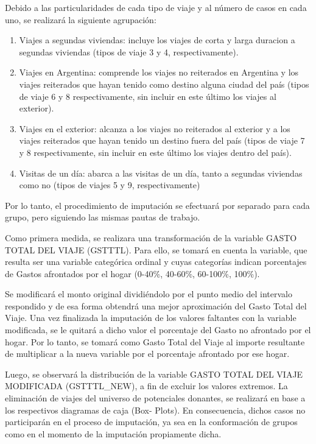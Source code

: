 \documentclass[
  openany]{book}
\begin{document}
Debido a las particularidades de cada tipo de viaje y al número de casos en cada uno, se realizará la siguiente agrupación:

\begin{enumerate}
\def\labelenumi{\arabic{enumi}.}
\item
  Viajes a segundas viviendas: incluye los viajes de corta y larga duracion a segundas viviendas (tipos de viaje 3 y 4, respectivamente).
\item
  Viajes en Argentina: comprende los viajes no reiterados en Argentina y los viajes reiterados que hayan tenido como destino alguna ciudad del país (tipos de viaje 6 y 8 respectivamente, sin incluir en este último los viajes al exterior).
\item
  Viajes en el exterior: alcanza a los viajes no reiterados al exterior y a los viajes reiterados que hayan tenido un destino fuera del país (tipos de viaje 7 y 8 respectivamente, sin incluir en este último los viajes dentro del país).
\item
  Visitas de un día: abarca a las visitas de un día, tanto a segundas viviendas como no (tipos de viajes 5 y 9, respectivamente)
\end{enumerate}

Por lo tanto, el procedimiento de imputación se efectuará por separado para cada grupo, pero siguiendo las mismas pautas de trabajo.

Como primera medida, se realizara una transformación de la variable GASTO TOTAL DEL VIAJE (GSTTTL). Para ello, se tomará en cuenta la variable, que resulta ser una variable categórica ordinal y cuyas categorías indican porcentajes de Gastos afrontados por el hogar (0-40\%, 40-60\%, 60-100\%, 100\%).

Se modificará el monto original dividiéndolo por el punto medio del intervalo respondido y de esa forma obtendrá una mejor aproximación del Gasto Total del Viaje. Una vez finalizada la imputación de los valores faltantes con la variable modificada, se le quitará a dicho valor el porcentaje del Gasto no afrontado por el hogar. Por lo tanto, se tomará como Gasto Total del Viaje al importe resultante de multiplicar a la nueva variable por el porcentaje afrontado por ese hogar.

Luego, se observará la distribución de la variable GASTO TOTAL DEL VIAJE MODIFICADA (GSTTTL\_NEW), a fin de excluir los valores extremos. La eliminación de viajes del universo de potenciales donantes, se realizará en base a los respectivos diagramas de caja (Box- Plots). En consecuencia, dichos casos no participarán en el proceso de imputación, ya sea en la conformación de grupos como en el momento de la imputación propiamente dicha.
\end{document}
